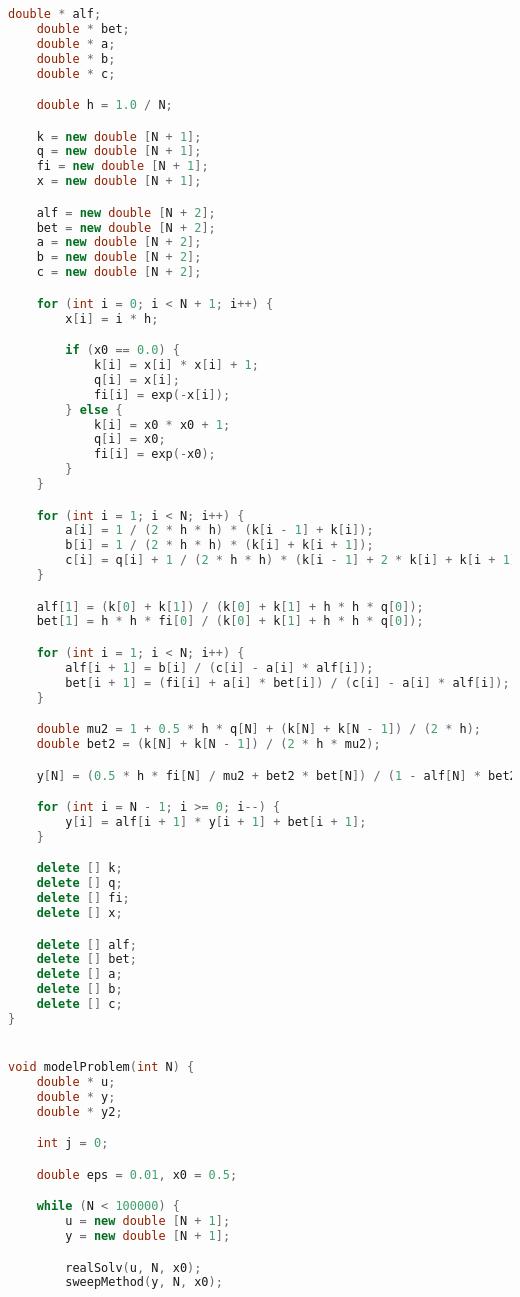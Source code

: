 \documentclass[a4paper,12pt,titlepage]{article}
\begin{document}
\begin{lstlisting}[language=C++, caption={Исходный код программы}]
    double * alf;
    double * bet;
    double * a;
    double * b;
    double * c;

    double h = 1.0 / N;

    k = new double [N + 1];
    q = new double [N + 1];
    fi = new double [N + 1];
    x = new double [N + 1];

    alf = new double [N + 2];
    bet = new double [N + 2];
    a = new double [N + 2];
    b = new double [N + 2];
    c = new double [N + 2];

    for (int i = 0; i < N + 1; i++) {
        x[i] = i * h;

        if (x0 == 0.0) {
            k[i] = x[i] * x[i] + 1;
            q[i] = x[i];
            fi[i] = exp(-x[i]);
        } else {
            k[i] = x0 * x0 + 1;
            q[i] = x0;
            fi[i] = exp(-x0);
        }
    }

    for (int i = 1; i < N; i++) {
        a[i] = 1 / (2 * h * h) * (k[i - 1] + k[i]);
        b[i] = 1 / (2 * h * h) * (k[i] + k[i + 1]);
        c[i] = q[i] + 1 / (2 * h * h) * (k[i - 1] + 2 * k[i] + k[i + 1]);
    }

    alf[1] = (k[0] + k[1]) / (k[0] + k[1] + h * h * q[0]);
    bet[1] = h * h * fi[0] / (k[0] + k[1] + h * h * q[0]);

    for (int i = 1; i < N; i++) {
        alf[i + 1] = b[i] / (c[i] - a[i] * alf[i]);
        bet[i + 1] = (fi[i] + a[i] * bet[i]) / (c[i] - a[i] * alf[i]); 
    }

    double mu2 = 1 + 0.5 * h * q[N] + (k[N] + k[N - 1]) / (2 * h);
    double bet2 = (k[N] + k[N - 1]) / (2 * h * mu2);

    y[N] = (0.5 * h * fi[N] / mu2 + bet2 * bet[N]) / (1 - alf[N] * bet2);

    for (int i = N - 1; i >= 0; i--) {
        y[i] = alf[i + 1] * y[i + 1] + bet[i + 1];
    }

    delete [] k;
    delete [] q;
    delete [] fi;
    delete [] x;

    delete [] alf;
    delete [] bet;
    delete [] a;
    delete [] b;
    delete [] c;
}


void modelProblem(int N) {
    double * u;
    double * y;
    double * y2;

    int j = 0;

    double eps = 0.01, x0 = 0.5;

    while (N < 100000) {
        u = new double [N + 1];
        y = new double [N + 1];

        realSolv(u, N, x0);
        sweepMethod(y, N, x0);


\end{lstlisting}
\end{document}
